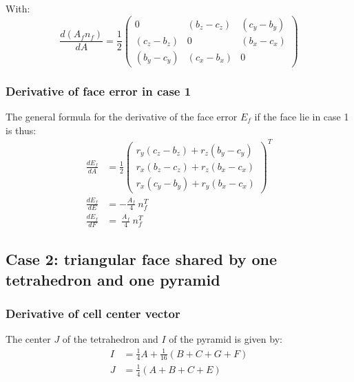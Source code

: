 \documentclass[11pt]{article}
\begin{document}
With:
\begin{equation}
\frac{d (A_f n_f)}{dA} = \frac{1}{2}
\begin{pmatrix}
0 & (b_z-c_z) & (c_y-b_y) \\
(c_z-b_z) & 0 & (b_x-c_x) \\
(b_y-c_y) & (c_x-b_x) & 0
\end{pmatrix}
\end{equation}

\subsubsection{Derivative of face error in case 1}

The general formula for the derivative of the face error $E_f$ if the face lie in case 1 is thus:
\begin{subequations}
\begin{align}
\frac{d E_f}{d A} &= \frac{1}{2}
\begin{pmatrix}
r_y(c_z-b_z) + r_z(b_y-c_y)\\
r_x(b_z-c_z) + r_z(b_x-c_x) \\
r_x(c_y-b_y) + r_y(b_x-c_x)
\end{pmatrix}^T
 \\
\frac{d E_f}{d E} &= - \frac{A_f }{4}\ n_f^T \\
\frac{d E_f}{d F} &= \ \frac{A_f }{4}\ n_f^T
\end{align}
\end{subequations} 




\subsection{Case 2: triangular face shared by one tetrahedron and one pyramid}

\subsubsection{Derivative of cell center vector}

The center $J$ of the tetrahedron and $I$ of the pyramid is given by:
\begin{subequations}
\begin{align}
I &= \frac{1}{4} A + \frac{1}{16} (B + C + G + F) \\
J &= \frac{1}{4} (A + B + C + E)
\end{align}
\end{subequations} 
\end{document}
